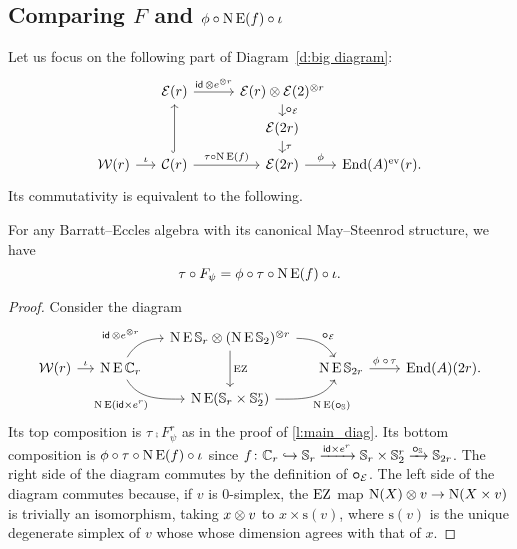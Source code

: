 \subsection{Comparing $F$ and $\phi \mathbin{\circ} \operatorname{N}\operatorname{E}(f) \mathbin{\circ} \iota$}

Let us focus on the following part of Diagram~\eqref{d:big diagram}:
\[
\begin{tikzcd}[row sep=small]
	&[-10pt]\BE(r) \arrow[r,"\id \, \ot e^{\ot r}"] &[5pt]
	\BE(r) \ot \BE(2)^{\ot r} \arrow[d,"\bcomp_{\BE}"] &[-20pt] \\ &
	&\BE(2r) \arrow[d, "\tau"] & \\
	\cW(r) \arrow[r,"\iota"] &
	\cC(r) \arrow[uu,hook] \arrow[r,"\tau \comp \chains\EE(f)"] &
	\BE(2r) \arrow[r,"\phi"] & \End(A)^\ev(r).
\end{tikzcd}
\]
Its commutativity is equivalent to the following.

\begin{lemma}\label{l:K0}
	For any Barratt--Eccles algebra with its canonical May--Steenrod structure, we have
	\[
	\tau \mathbin{\circ} F_\psi = \phi \mathbin{\circ} \tau \mathbin{\circ} \operatorname{N}\operatorname{E}(f) \mathbin{\circ} \iota.
	\]
\end{lemma}

\begin{proof}
	Consider the diagram
	\[\label{d:F and f}
		\begin{tikzcd}[column sep=small,row sep=tiny]
			&& \chains\EE\sym_r \ot (\chains\EE\sym_2)^{\ot r}
			\arrow[dr,"\bcomp_{\BE}",out=0,in=120]
			\arrow[dd,"\EZ"] &&[10pt] \\
			\cW(r) \arrow[r,"\iota"] &
			\chains\EE\cyc_r
			\arrow[ur,"\id \, \ot e^{\ot r}", out=60,in=180]
			\arrow[dr,"\chains\EE(\id \times e^r)"',out=-60,in=180]
			& & \chains\EE\sym_{2r} \arrow[r,"\phi\;\comp\,\tau"] &
			\End(A)(2r). \\
			&& \chains\EE(\sym_r \times \sym_2^r)
			\arrow[ur, "\chains\EE(\bcomp_{\sym})"', out=0,in=-120]
			&
		\end{tikzcd}
	\]
	Its top composition is $\tau \comp F_\psi^r$ as in the proof of \cref{l:main_diag}.
	Its bottom composition is $\phi \mathbin{\circ} \tau \mathbin{\circ} \operatorname{N}\operatorname{E}(f) \mathbin{\circ} \iota$ since $f \colon \mathbb{C}_r \hookrightarrow \mathbb{S}_r \xrightarrow{\mathsf{id} \times e^r} \mathbb{S}_r \times \mathbb{S}_2^r \xrightarrow{\bm{\mathbin{\circ}}_{\mathbb{S}}} \mathbb{S}_{2r}$.
	The right side of the diagram commutes by the definition of $\bm{\mathbin{\circ}}_{\mathcal{E}}$.
	The left side of the diagram commutes because, if $v$ is $0$-simplex, the $\operatorname{EZ}$ map $\operatorname{N}(X) \otimes v \to \operatorname{N}(X \times v)$ is trivially an isomorphism, taking $x \otimes v$ to $x \times \mathrm{s}(v)$, where $\mathrm{s}(v)$ is the unique degenerate simplex of $v$ whose whose dimension agrees with that of $x$.
\end{proof}

